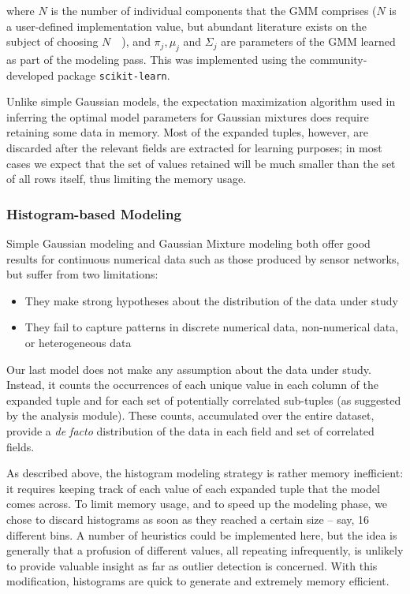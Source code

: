where $N$ is the number of individual components that the GMM comprises ($N$ is a user-defined implementation value, but abundant literature exists on the subject of choosing $N$~\cite{Schwartz1978}~\cite{Akaike1974}), and $\pi_j, \mu_j$ and $\Sigma_j$ are parameters of the GMM learned as part of the modeling pass. This was implemented using the community-developed package \texttt{scikit-learn}. 

Unlike simple Gaussian models, the expectation maximization algorithm used in inferring the optimal model parameters for Gaussian mixtures does require retaining some data in memory. Most of the expanded tuples, however, are discarded after the relevant fields are extracted for learning purposes; in most cases we expect that the set of values retained will be much smaller than the set of all rows itself, thus limiting the memory usage.

\subsubsection{Histogram-based Modeling}
Simple Gaussian modeling and Gaussian Mixture modeling both offer good results for continuous numerical data such as those produced by sensor networks, but suffer from two limitations:

\begin{itemize}
\item They make strong hypotheses about the distribution of the data under study
\item They fail to capture patterns in discrete numerical data, non-numerical data, or heterogeneous data
\end{itemize}

Our last model does not make any assumption about the data under study. Instead, it counts the occurrences of each unique value in each column of the expanded tuple and for each set of potentially correlated sub-tuples (as suggested by the analysis module). These counts, accumulated over the entire dataset, provide a \emph{de facto} distribution of the data in each field and set of correlated fields. 

As described above, the histogram modeling strategy is rather memory inefficient: it requires keeping track of each value of each expanded tuple that the model comes across. To limit memory usage, and to speed up the modeling phase, we chose to discard histograms as soon as they reached a certain size -- say, 16 different bins. A number of heuristics could be implemented here, but the idea is generally that a profusion of different values, all repeating infrequently, is unlikely to provide valuable insight as far as outlier detection is concerned. With this modification, histograms are quick to generate and extremely memory efficient. 

